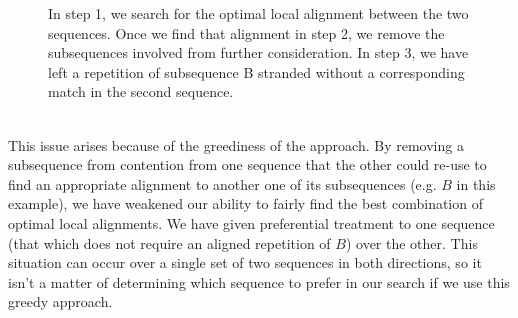 \documentclass[a4paper,12pt]{report} 	%
\numberwithin{figure}{chapter}
\numberwithin{table}{chapter}
\numberwithin{equation}{chapter}
\begin{document}
\begin{flushleft}
\begin{figure}[!p]
\begin{center}
\caption[Symmetric Greedy Removal After Matching]{In step 1, we search for the optimal local alignment between the two sequences. Once we find that alignment in step 2, we remove the subsequences involved from further consideration. In step 3, we have left a repetition of subsequence B stranded without a corresponding match in the second sequence.}
\end{center}
\end{figure}
\\
This issue arises because of the greediness of the approach. By removing a subsequence from contention from one sequence that the other could re-use to find an appropriate alignment to another one of its subsequences (e.g. $B$ in this example), we have weakened our ability to fairly find the best combination of optimal local alignments. We have given preferential treatment to one sequence (that which does not require an aligned repetition of $B$) over the other. This situation can occur over a single set of two sequences in both directions, so it isn't a matter of determining which sequence to prefer in our search if we use this greedy approach. 


\end{flushleft}
\end{document}
